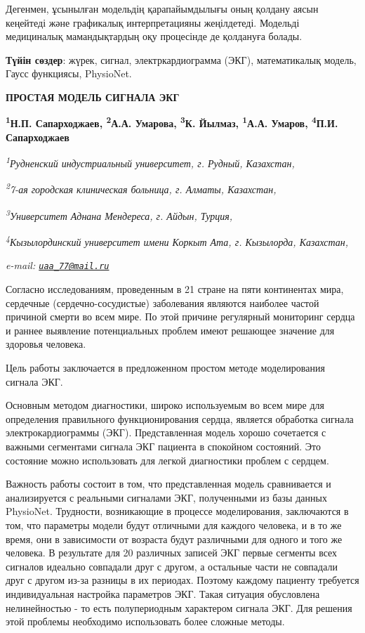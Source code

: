 Дегенмен, ұсынылған модельдің қарапайымдылығы оның қолдану аясын
кеңейтеді және графикалық интерпретацияны жеңілдетеді. Модельді
медициналық мамандықтардың оқу процесінде де қолдануға болады.

{\bfseries Түйін сөздер}: жүрек, сигнал, электркардиограмма (ЭКГ),
математикалық модель, Гаусс функциясы, PhysioNet.

\begin{articleheader}
{\bfseries ПРОСТАЯ МОДЕЛЬ СИГНАЛА ЭКГ}

{\bfseries
\textsuperscript{1}Н.П. Сапарходжаев,
\textsuperscript{2}А.А. Умарова,
\textsuperscript{3}К. Йылмаз,
\textsuperscript{1}А.А. Умаров,
\textsuperscript{4}П.И. Сапарходжаев}
\end{articleheader}

\begin{affiliation}
\emph{\textsuperscript{1}Рудненский индустриальный университет, г. Рудный, Казахстан,}

\emph{\textsuperscript{2}7-ая городская клиническая больница, г. Алматы, Казахстан,}

\emph{\textsuperscript{3}Университет Аднана Мендереса, г. Айдын, Турция,}

\emph{\textsuperscript{4}Кызылординский университет имени Коркыт Ата, г. Кызылорда, Казахстан,}

\emph{e-mail: \href{mailto:uaa_77@mail.ru}{\nolinkurl{uaa\_77@mail.ru}}}
\end{affiliation}

Согласно исследованиям, проведенным в 21 стране на пяти континентах
мира, сердечные (сердечно-сосудистые) заболевания являются наиболее
частой причиной смерти во всем мире. По этой причине регулярный
мониторинг сердца и раннее выявление потенциальных проблем имеют
решающее значение для здоровья человека.

Цель работы заключается в предложенном простом методе моделирования
сигнала ЭКГ.

Основным методом диагностики, широко используемым во всем мире для
определения правильного функционирования сердца, является обработка
сигнала электрокардиограммы (ЭКГ). Представленная модель хорошо
сочетается с важными сегментами сигнала ЭКГ пациента в спокойном
состояний. Это состояние можно использовать для легкой диагностики
проблем с сердцем.

Важность работы состоит в том, что представленная модель сравнивается и
анализируется с реальными сигналами ЭКГ, полученными из базы данных
PhysioNet. Трудности, возникающие в процессе моделирования, заключаются
в том, что параметры модели будут отличными для каждого человека, и в то
же время, они в зависимости от возраста будут различными для одного и
того же человека. В результате для 20 различных записей ЭКГ первые
сегменты всех сигналов идеально совпадали друг с другом, а остальные
части не совпадали друг с другом из-за разницы в их периодах. Поэтому
каждому пациенту требуется индивидуальная настройка параметров ЭКГ.
Такая ситуация обусловлена нелинейностью - то есть полупериодным
характером сигнала ЭКГ. Для решения этой проблемы необходимо
использовать более сложные методы.

